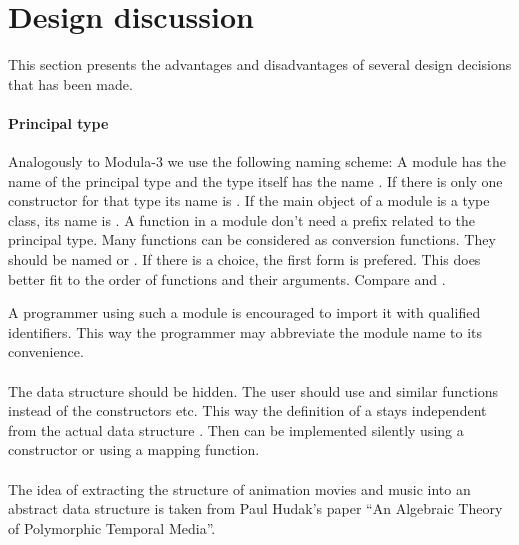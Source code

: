 \section{Design discussion}

This section presents the advantages and disadvantages
of several design decisions that has been made.

\paragraph*{Principal type }

Analogously to Modula-3 we use the following naming scheme:
A module has the name of the principal type
and the type itself has the name .
If there is only one constructor for that type its name is .
If the main object of a module is a type class, its name is .
A function in a module don't need a prefix related to the principal type.
Many functions can be considered as conversion functions.
They should be named 
or .
If there is a choice, the first form is prefered.
This does better fit to the order of functions and their arguments.
Compare  and .

A programmer using such a module is encouraged
to import it with qualified identifiers.
This way the programmer may abbreviate the module name to its convenience.

\paragraph*{}

The data structure should be hidden.
The user should use  and similar functions
instead of the constructors  etc.
This way the definition of a 
stays independent from the actual data structure .
Then  can be implemented silently
using a constructor or using a mapping function.

\paragraph*{}


The idea of extracting the structure of animation movies and music
into an abstract data structure is taken from Paul Hudak's paper
``An Algebraic Theory of Polymorphic Temporal Media''.

